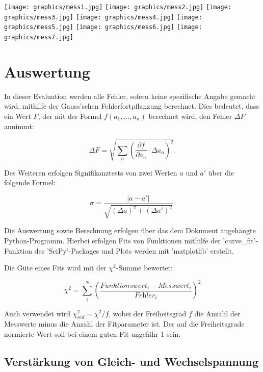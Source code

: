 \documentclass{article}
\begin{document}
\texttt{[image: graphics/mess1.jpg]}
\newpage
\texttt{[image: graphics/mess2.jpg]}
\newpage
\texttt{[image: graphics/mess3.jpg]}
\newpage
\texttt{[image: graphics/mess4.jpg]}
\newpage
\texttt{[image: graphics/mess5.jpg]}
\newpage
\texttt{[image: graphics/mess6.jpg]}
\newpage
\texttt{[image: graphics/mess7.jpg]}
\newpage

\addtocounter{table}{7}


\clearpage
\newpage
\section{Auswertung}

In dieser Evaluation werden alle Fehler, sofern keine spezifische Angabe gemacht wird, mithilfe der Gauss'schen Fehlerfortpflanzung berechnet. Dies bedeutet, dass ein Wert $F$, der mit der Formel $f(a_1, ..., a_n)$ berechnet wird, den Fehler $\Delta F$ annimmt:

\begin{equation}
    \Delta F = \sqrt{\sum_n \left( \frac{\partial f}{\partial a_n} \cdot \Delta a_n \right)^2}.
\end{equation}

Des Weiteren erfolgen Signifikanztests von zwei Werten $a$ und $a'$ über die folgende Formel:

\begin{equation}
    \sigma = \frac{|a-a'|}{\sqrt{(\Delta a)^2 + (\Delta a')^2}}.
\end{equation}

Die Auswertung sowie Berechnung erfolgen über das dem Dokument angehängte Python-Programm. Hierbei erfolgen Fits von Funktionen mithilfe der 'curve\_fit'-Funktion des 'SciPy'-Packages und Plots werden mit 'matplotlib' erstellt.

Die Güte eines Fits wird mit der $\chi^2$-Summe bewertet:

\begin{equation}
    \chi^2 = \sum_i^N \left( \frac{\textit{Funktionswert}_i - \textit{Messwert}_i}{\textit{Fehler}_i} \right)^2
\end{equation}

Auch verwendet wird $\chi^2_{red} = \chi^2 / f$, wobei der Freiheitsgrad $f$ die Anzahl der Messwerte minus die Anzahl der Fitparameter ist. Der auf die Freiheitsgrade normierte Wert soll bei einem guten Fit ungefähr 1 sein.

\newpage

\subsection{Verstärkung von Gleich- und Wechselspannung}
\end{document}
